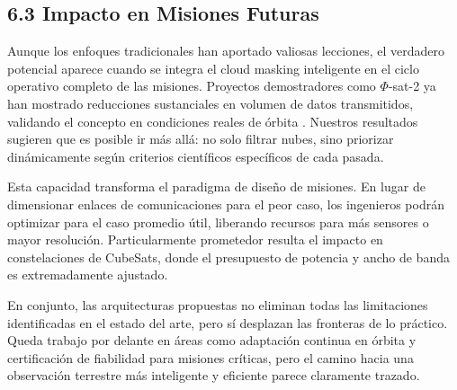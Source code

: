 \subsection{6.3 Impacto en Misiones Futuras}

Aunque los enfoques tradicionales han aportado valiosas lecciones, el verdadero potencial aparece cuando se integra el cloud masking inteligente en el ciclo operativo completo de las misiones. Proyectos demostradores como $\Phi$-sat-2 ya han mostrado reducciones sustanciales en volumen de datos transmitidos, validando el concepto en condiciones reales de órbita \cite{KP_Labs2024_PhiSat}. Nuestros resultados sugieren que es posible ir más allá: no solo filtrar nubes, sino priorizar dinámicamente según criterios científicos específicos de cada pasada.

Esta capacidad transforma el paradigma de diseño de misiones. En lugar de dimensionar enlaces de comunicaciones para el peor caso, los ingenieros podrán optimizar para el caso promedio útil, liberando recursos para más sensores o mayor resolución. Particularmente prometedor resulta el impacto en constelaciones de CubeSats, donde el presupuesto de potencia y ancho de banda es extremadamente ajustado.

En conjunto, las arquitecturas propuestas no eliminan todas las limitaciones identificadas en el estado del arte, pero sí desplazan las fronteras de lo práctico. Queda trabajo por delante en áreas como adaptación continua en órbita y certificación de fiabilidad para misiones críticas, pero el camino hacia una observación terrestre más inteligente y eficiente parece claramente trazado.